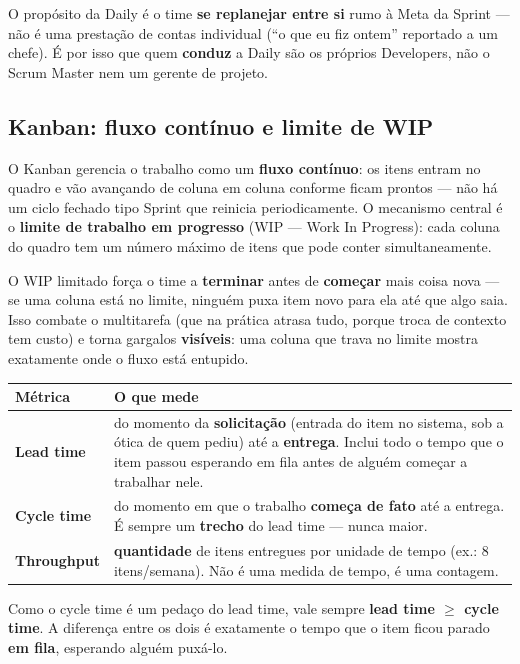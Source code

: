 \begin{cuidado}
O propósito da Daily é o time \textbf{se replanejar entre si} rumo à Meta
da Sprint --- não é uma prestação de contas individual (“o que eu fiz
ontem” reportado a um chefe). É por isso que quem \textbf{conduz} a Daily
são os próprios Developers, não o Scrum Master nem um gerente de projeto.
\end{cuidado}

\subsection{Kanban: fluxo contínuo e limite de WIP}

\begin{conceito}
O Kanban gerencia o trabalho como um \textbf{fluxo contínuo}: os itens
entram no quadro e vão avançando de coluna em coluna conforme ficam prontos
--- não há um ciclo fechado tipo Sprint que reinicia periodicamente. O
mecanismo central é o \textbf{limite de trabalho em progresso} (WIP --- Work
In Progress): cada coluna do quadro tem um número máximo de itens que pode
conter simultaneamente.

O WIP limitado força o time a \textbf{terminar} antes de \textbf{começar}
mais coisa nova --- se uma coluna está no limite, ninguém puxa item novo
para ela até que algo saia. Isso combate o multitarefa (que na prática
atrasa tudo, porque troca de contexto tem custo) e torna gargalos
\textbf{visíveis}: uma coluna que trava no limite mostra exatamente onde o
fluxo está entupido.
\end{conceito}

\begin{conceito}
\begin{center}
\begin{tabular}{@{}p{2.6cm}p{8.4cm}@{}}
\toprule
\textbf{Métrica} & \textbf{O que mede} \\
\midrule
\textbf{Lead time} & do momento da \textbf{solicitação} (entrada do item no
sistema, sob a ótica de quem pediu) até a \textbf{entrega}. Inclui todo o
tempo que o item passou esperando em fila antes de alguém começar a
trabalhar nele. \\
\textbf{Cycle time} & do momento em que o trabalho \textbf{começa de fato}
até a entrega. É sempre um \textbf{trecho} do lead time --- nunca maior. \\
\textbf{Throughput} & \textbf{quantidade} de itens entregues por unidade de
tempo (ex.: 8 itens/semana). Não é uma medida de tempo, é uma contagem. \\
\bottomrule
\end{tabular}
\end{center}

Como o cycle time é um pedaço do lead time, vale sempre \textbf{lead time
$\geq$ cycle time}. A diferença entre os dois é exatamente o tempo que o
item ficou parado \textbf{em fila}, esperando alguém puxá-lo.
\end{conceito}

